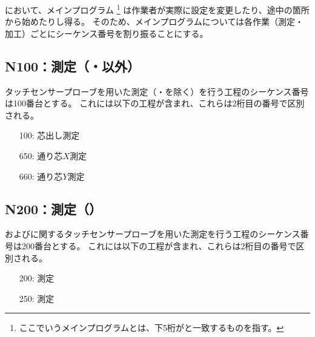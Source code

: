 \clearpage
\DMC において、メインプログラム
\footnote{ここでいうメインプログラムとは、下5桁が\DrawingNumber と一致するものを指す。}
は作業者が実際に設定を変更したり、途中の箇所から始めたりし得る。
そのため、メインプログラムについては各作業（測定・加工）ごとにシーケンス番号を割り振ることにする。


\subsection{N100：測定（\Dimple ・\ReliefGroove 以外）}
タッチセンサープローブを用いた測定（\Dimple ・\ReliefGroove を除く）を行う工程のシーケンス番号は100番台とする。
これには以下の工程が含まれ、これらは2桁目の番号で区別される。
\begin{enumerate}
\item[100:] 芯出し測定
\item[650:] 通り芯$X$測定
\item[660:] 通り芯$Y$測定
\end{enumerate}


\subsection{N200：測定（\Dimple）}
\Dimple および\ReliefGroove に関するタッチセンサープローブを用いた測定を行う工程のシーケンス番号は200番台とする。
これには以下の工程が含まれ、これらは2桁目の番号で区別される。
\begin{enumerate}
\item[200:] \Dimple 測定
\item[250:] \ReliefGroove 測定
\end{enumerate}


